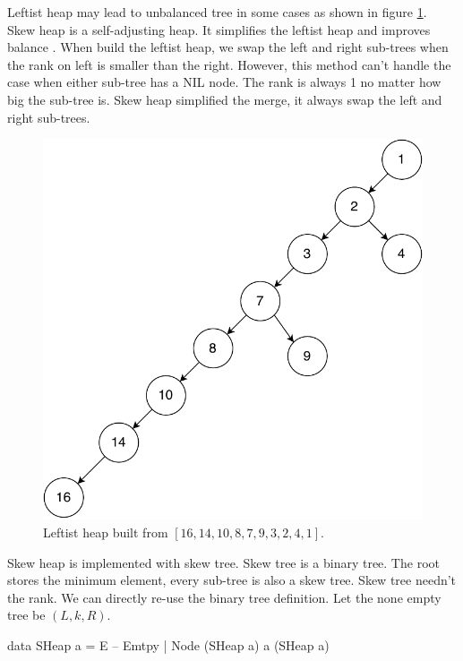 \documentclass[b5paper]{article}
\begin{document}
Leftist heap may lead to unbalanced tree in some cases as shown in figure \ref{fig:unbalanced-leftist-tree}. Skew heap is a self-adjusting heap. It simplifies the leftist heap and improves balance\cite{wiki-skew-heap} \cite{self-adjusting-heaps}. When build the leftist heap, we swap the left and right sub-trees when the rank on left is smaller than the right. However, this method can't handle the case when either sub-tree has a NIL node. The rank is always 1 no matter how big the sub-tree is. Skew heap simplified the merge, it always swap the left and right sub-trees.

\begin{figure}[htbp]
  \centering
  \includegraphics[scale=0.45]{img/unbalanced-leftist-tree}
  \caption{Leftist heap built from $[16, 14, 10, 8, 7, 9, 3, 2, 4, 1]$.}
  \label{fig:unbalanced-leftist-tree}
\end{figure}

Skew heap is implemented with skew tree. Skew tree is a binary tree. The root stores the minimum element, every sub-tree is also a skew tree. Skew tree needn't the rank. We can directly re-use the binary tree definition. Let the none empty tree be $(L, k, R)$.

\begin{Haskell}
data SHeap a = E -- Emtpy
             | Node (SHeap a) a (SHeap a)
\end{Haskell}
\end{document}
